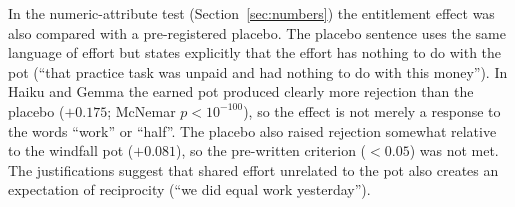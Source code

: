 \documentclass[11pt]{article}
\begin{document}
In the numeric-attribute test (Section~\ref{sec:numbers}) the entitlement effect was also compared with a pre-registered placebo. The placebo sentence uses the same language of effort but states explicitly that the effort has nothing to do with the pot (``that practice task was unpaid and had nothing to do with this money''). In Haiku and Gemma the earned pot produced clearly more rejection than the placebo ($+0.175$; McNemar $p < 10^{-100}$), so the effect is not merely a response to the words ``work'' or ``half''. The placebo also raised rejection somewhat relative to the windfall pot ($+0.081$), so the pre-written criterion ($< 0.05$) was not met. The justifications suggest that shared effort unrelated to the pot also creates an expectation of reciprocity (``we did equal work yesterday'').




\end{document}
